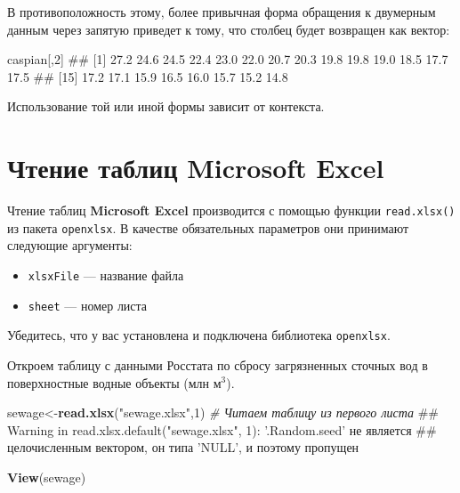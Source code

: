 \documentclass[]{book}
\newenvironment{Shaded}{\begin{snugshade}}{\end{snugshade}}
\newcommand{\KeywordTok}[1]{\textcolor[rgb]{0.13,0.29,0.53}{\textbf{#1}}}
\newcommand{\DecValTok}[1]{\textcolor[rgb]{0.00,0.00,0.81}{#1}}
\newcommand{\StringTok}[1]{\textcolor[rgb]{0.31,0.60,0.02}{#1}}
\newcommand{\CommentTok}[1]{\textcolor[rgb]{0.56,0.35,0.01}{\textit{#1}}}
\newcommand{\NormalTok}[1]{#1}
\providecommand{\tightlist}{%
  \setlength{\itemsep}{0pt}\setlength{\parskip}{0pt}}
\begin{document}
В противоположность этому, более привычная форма обращения к двумерным
данным через запятую приведет к тому, что столбец будет возвращен как
вектор:

\begin{Shaded}
\begin{Highlighting}[]
\NormalTok{caspian[,}\DecValTok{2}\NormalTok{]}
\NormalTok{##  [1] 27.2 24.6 24.5 22.4 23.0 22.0 20.7 20.3 19.8 19.8 19.0 18.5 17.7 17.5}
\NormalTok{## [15] 17.2 17.1 15.9 16.5 16.0 15.7 15.2 14.8}
\end{Highlighting}
\end{Shaded}

Использование той или иной формы зависит от контекста.

\section{Чтение таблиц Microsoft Excel}\label{excel_reading}

Чтение таблиц \textbf{Microsoft Excel} производится с помощью функции
\texttt{read.xlsx()} из пакета \texttt{openxlsx}. В качестве
обязательных параметров они принимают следующие аргументы:

\begin{itemize}
\tightlist
\item
  \texttt{xlsxFile} --- название файла
\item
  \texttt{sheet} --- номер листа
\end{itemize}

Убедитесь, что у вас установлена и подключена библиотека
\texttt{openxlsx}.

Откроем таблицу с данными Росстата по сбросу загрязненных сточных вод в
поверхностные водные объекты (млн м\(^3\)).

\begin{Shaded}
\begin{Highlighting}[]
\NormalTok{sewage<-}\KeywordTok{read.xlsx}\NormalTok{(}\StringTok{"sewage.xlsx"}\NormalTok{,}\DecValTok{1}\NormalTok{) }\CommentTok{# Читаем таблицу из первого листа}
\NormalTok{## Warning in read.xlsx.default("sewage.xlsx", 1): '.Random.seed' не является}
\NormalTok{## целочисленным вектором, он типа 'NULL', и поэтому пропущен}
\end{Highlighting}
\end{Shaded}

\begin{Shaded}
\begin{Highlighting}[]
\KeywordTok{View}\NormalTok{(sewage)}
\end{Highlighting}
\end{Shaded}
\end{document}
